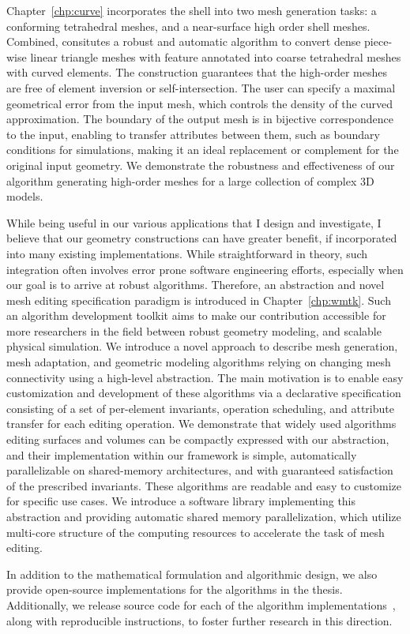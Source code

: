%

Chapter~\ref*{chp:curve} incorporates the  shell into two mesh generation tasks: a conforming tetrahedral meshes, and a near-surface high order shell meshes. Combined, consitutes a robust and automatic algorithm to convert dense piece-wise linear triangle meshes with feature annotated into coarse tetrahedral meshes with curved elements. The construction guarantees that the high-order meshes are free of element inversion or self-intersection. 
The user can specify a maximal geometrical error from the input mesh, which  controls the density of the curved approximation. The boundary of the output mesh is in bijective correspondence to the input, enabling to transfer attributes between them, such as boundary conditions for simulations, making it an ideal replacement or complement for the original input geometry. We demonstrate the robustness and effectiveness of our algorithm generating high-order meshes for a large collection of complex 3D models.

While being useful in our various applications that I design and investigate, I believe that our geometry constructions can have greater benefit, if incorporated into many existing implementations. While straightforward in theory, such integration often involves error prone software engineering efforts, especially when our goal is to arrive at robust algorithms. Therefore, an abstraction and novel mesh editing specification paradigm is introduced in Chapter~\ref*{chp:wmtk}. Such an algorithm development toolkit aims to make our contribution accessible for more researchers in the field between robust geometry modeling, and scalable physical simulation.
We introduce a novel approach to describe mesh generation, mesh adaptation, and geometric modeling algorithms relying on changing mesh connectivity using a high-level abstraction. The main motivation is to enable easy customization and development of these algorithms via a declarative specification consisting of a set of per-element invariants, operation scheduling, and attribute transfer for each editing operation.
We demonstrate that widely used algorithms editing surfaces and volumes can be compactly expressed with our abstraction, and their implementation within our framework is simple, automatically parallelizable on shared-memory architectures, and with guaranteed satisfaction of the prescribed invariants. These algorithms are readable and easy to customize for specific use cases.
We introduce a software library implementing this abstraction and providing automatic shared memory parallelization, which utilize multi-core structure of the computing resources to accelerate the task of mesh editing.

In addition to the mathematical formulation and algorithmic design, we also provide open-source implementations for the algorithms in the thesis.
Additionally, we release source code for each of the algorithm implementations~\cite{githubScaffoldMap,githubshell,githubbichon}, along with reproducible instructions, to foster further research in this direction.
